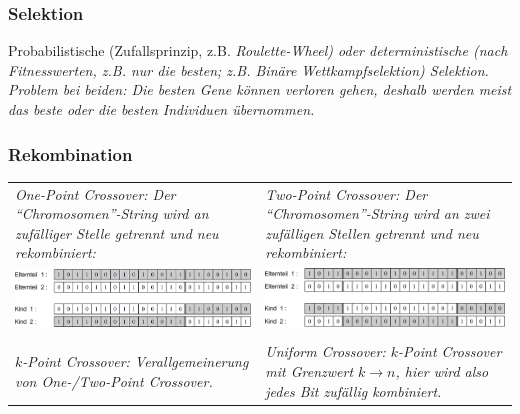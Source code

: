   
\subsubsection{Selektion }
  Probabilistische (Zufallsprinzip, z.B. \em Roulette-Wheel\em ) oder deterministische (nach Fitnesswerten, z.B. nur die besten; z.B. \em Binäre Wettkampfselektion\em ) Selektion. Problem bei beiden: Die besten Gene können verloren gehen, deshalb werden meist das beste oder die besten Individuen übernommen.
  
\subsubsection{Rekombination }
  \begin{tabularx}{\textwidth}{p{9cm} p{9cm}}
    \em One-Point Crossover\em : Der "`Chromosomen"'-String wird an zufälliger Stelle getrennt und neu rekombiniert: 
      & \em Two-Point Crossover\em : Der "`Chromosomen"'-String wird an zwei zufälligen Stellen getrennt und neu rekombiniert: \\
    \includegraphics[width=8cm]{./Content/MetaHeuristics/GeneticAlgorithms_OnePointCrossover}
      & \includegraphics[width=8cm]{./Content/MetaHeuristics/GeneticAlgorithms_TwoPointCrossover} \\ \\
    \em $k$-Point Crossover\em : Verallgemeinerung von One-/Two-Point Crossover.
      & \em Uniform Crossover\em : $k$-Point Crossover mit Grenzwert $k \rightarrow n$, hier wird also jedes Bit zufällig kombiniert.
  \end{tabularx}
   
  
